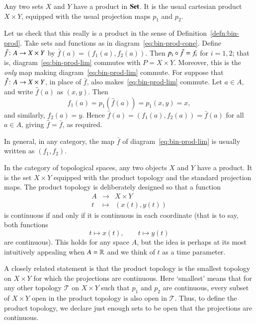 \begin{example}
\label{eg:sets}
Any two sets $X$ and $Y$ have a product%
%
%
in $\mathbf{Set}$.  It is the usual cartesian product $X \times Y$, equipped with
the usual projection maps $p_1$ and $p_2$.

Let us check that this really is a product in the sense of
Definition~\ref{defn:bin-prod}.  Take sets and functions as in
diagram~\eqref{eq:bin-prod-cone}.  Define $\bar{f}\from A \to X \times Y$
by $\bar{f}(a) = (f_1(a), f_2(a))$.  Then $p_i \mathbin{\circ} \bar{f} = f_i$ for $i =
1, 2$; that is, diagram~\eqref{eq:bin-prod-lim} commutes with $P = X \times
Y$.  Moreover, this is the \emph{only} map making
diagram~\eqref{eq:bin-prod-lim} commute.  For suppose that $\hat{f}\from A
\to X \times Y$, in place of $\bar{f}$, also makes~\eqref{eq:bin-prod-lim}
commute.  Let $a \in A$, and write $\hat{f}(a)$ as $(x, y)$.  Then
\[
f_1(a) = p_1(\hat{f}(a)) = p_1(x, y) = x,
\]
and similarly, $f_2(a) = y$.  Hence $\hat{f}(a) = (f_1(a), f_2(a)) =
\bar{f}(a)$ for all $a \in A$, giving $\hat{f} = \bar{f}$, as required.
\end{example}

In general, in any category, the map $\bar{f}$ of
diagram~\eqref{eq:bin-prod-lim} is usually written as $(f_1, f_2)$.

\begin{example}
\label{eg:prod-spaces}
In the category of topological spaces, any two objects $X$ and $Y$ have a
product.%
%
%
It is the set $X \times Y$ equipped with the product topology and the
standard projection maps.  The product topology is deliberately designed so
that a function
\[
\begin{array}{ccc}
A       &\to            &X \times Y     \\
t       &\mapsto        &(x(t), y(t))
\end{array}
\]
is continuous if and only if it is continuous in each coordinate (that is to
say, both functions
\[
t \mapsto x(t),
\qquad
t \mapsto y(t)
\]
are continuous).  This holds for any space $A$, but the idea is perhaps at
its most intuitively appealing when $A = \mathbb{R}$ and we think of $t$ as a
time parameter.

A closely related statement is that the product topology is the smallest
topology on $X \times Y$ for which the projections are continuous.  Here
`smallest' means that for any other topology $\mathcal{T}$ on $X \times Y$
such that $p_1$ and $p_2$ are continuous, every subset of $X \times Y$ open
in the product topology is also open in $\mathcal{T}$.  Thus, to define the
product topology, we declare just enough sets to be open that the
projections are continuous.
\end{example}

